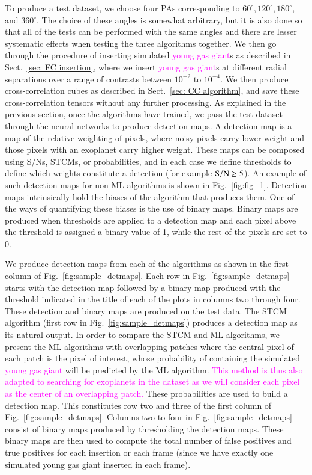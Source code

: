 \documentclass[referee]{aa} %
\newcommand{\newchange}[1]{\textcolor{magenta}{#1}}
\begin{document}
To produce a test dataset, we choose four PAs corresponding to $60^{\circ},120^{\circ},180^{\circ}$, and $360^{\circ}$.
The choice of these angles is somewhat arbitrary, but it is also done so that all of the tests can be performed with the same angles and there are lesser systematic effects when testing the three algorithms together.
We then go through the procedure of inserting simulated \newchange{young gas giant}s as described in Sect.~\ref{sec: FC insertion}, where we insert \newchange{young gas giant}s at different radial separations over a range of contrasts between $10^{-2}$ to $10^{-4}$. We then produce cross-correlation cubes as described in Sect.~\ref{sec: CC algorithm}, and save these cross-correlation tensors without any further processing. As explained in the previous section, once the algorithms have trained, we pass the test dataset through the neural networks to produce detection maps.
A detection map is a map of the relative weighting of pixels, where noisy pixels carry lower weight and those pixels with an exoplanet carry higher weight.
These maps can be composed using S/Ns, STCMs, or probabilities, and in each case we define thresholds to define which weights constitute a detection (for example $\rm{S/N}\ge 5$).
An example of such detection maps for non-ML algorithms is shown in Fig.~\ref{fig:fig_1}.
Detection maps intrinsically hold the biases of the algorithm that produces them. %
One of the ways of quantifying these biases is the use of  binary maps.
Binary maps are produced when thresholds are applied to a detection map and each pixel above the threshold is assigned a binary value of 1, while the rest of the pixels are set to 0.

We produce detection maps from each of the algorithms as shown in the first column of Fig.~\ref{fig:sample_detmaps}.
Each row in Fig.~\ref{fig:sample_detmaps} starts with the detection map followed by a binary map produced with the threshold indicated in the title of each of the plots in columns two through four.
These detection and binary maps are produced on the test data.
The STCM algorithm (first row in Fig.~\ref{fig:sample_detmaps}) produces a detection map as its natural output.
In order to compare the STCM and ML algorithms, we present the ML algorithms with overlapping patches where the central pixel of each patch is the pixel of interest, whose probability of containing the simulated \newchange{young gas giant} will be predicted by the ML algorithm.
\newchange{This method is thus also adapted to searching for exoplanets in the dataset as we will consider each pixel as the center of an overlapping patch.}
These probabilities are used to build a detection map.
This constitutes row two and three of the first column of Fig.~\ref{fig:sample_detmaps}.
Columns two to four in Fig.~\ref{fig:sample_detmaps} consist of binary maps produced by thresholding the detection maps.
These binary maps are then used to compute the total number of false positives and true positives for each insertion or each frame (since we have exactly one simulated young gas giant inserted in each frame).
\end{document}
